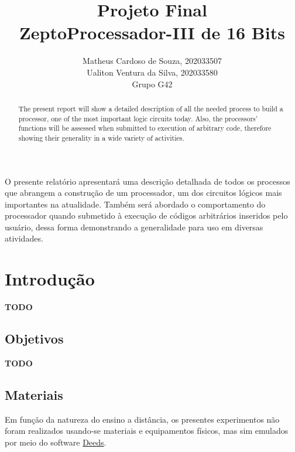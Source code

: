\documentclass[12pt]{article}
\title{Projeto Final\\
ZeptoProcessador-III de 16 Bits}
\author{Matheus Cardoso de Souza, 202033507\\
        Ualiton Ventura da Silva, 202033580\\
        Grupo G42
}
\begin{document}
\maketitle

 \begin{abstract}
   The present report will show a detailed description of all the needed process
   to build a processor, one of the most important logic circuits today. Also,
   the processors' functions will be assessed when submitted to execution of
   arbitrary code, therefore showing their generality in a wide variety of
   activities.
 \end{abstract}

 \begin{resumo}
   O presente relatório apresentará uma descrição detalhada de todos os
   processos que abrangem a construção de um processador, um dos circuitos
   lógicos mais importantes na atualidade. Também será abordado o comportamento
   do processador quando submetido à execução de códigos arbitrários inseridos
   pelo usuário, dessa forma demonstrando a generalidade para uso em diversas
   atividades.
 \end{resumo}


\section{Introdução}\label{sec:Introducao}

\textbf{TODO}

\subsection{Objetivos}\label{sec:Objetivos}

\textbf{TODO}

\subsection{Materiais}\label{sec:Materiais}

Em função da natureza do ensino a distância, os presentes experimentos não foram
realizados usando-se materiais e equipamentos físicos, mas sim emulados por meio
do software
\href{https://www.digitalelectronicsdeeds.com/downloads.html}{Deeds}.
\end{document}
